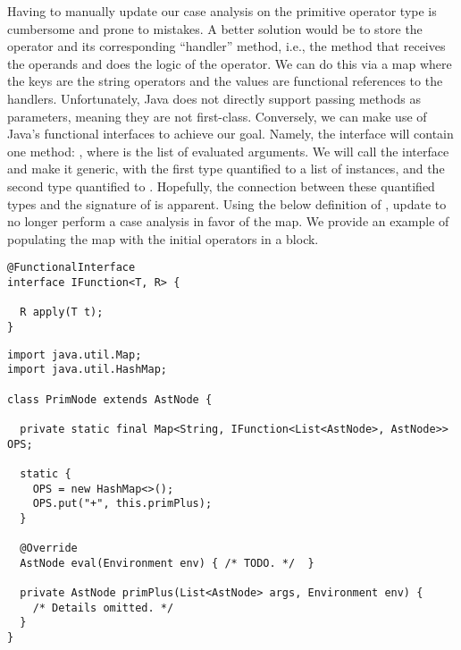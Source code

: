  Having to manually update our case analysis on the primitive operator type is cumbersome and prone to mistakes. A better solution would be to store the operator and its corresponding ``handler'' method, i.e., the method that receives the operands and does the logic of the operator. We can do this via a map where the keys are the string operators and the values are functional references to the handlers. Unfortunately, Java does not directly support passing methods as parameters, meaning they are not first-class. Conversely, we can make use of Java's functional interfaces to achieve our goal. Namely, the interface will contain one method: , where  is the list of evaluated arguments. We will call the interface  and make it generic, with the first type quantified to a list of  instances, and the second type quantified to . Hopefully, the connection between these quantified types and the signature of  is apparent. Using the below definition of , update  to no longer perform a case analysis in favor of the map. We provide an example of populating the map with the initial operators in a  block.

\begin{lstlisting}[language=MyJava]
@FunctionalInterface
interface IFunction<T, R> {
  
  R apply(T t);
}
\end{lstlisting}

\enlargethispage{1\baselineskip}
\begin{lstlisting}[language=MyJava]
import java.util.Map;
import java.util.HashMap;

class PrimNode extends AstNode {
  
  private static final Map<String, IFunction<List<AstNode>, AstNode>> OPS;
  
  static {
    OPS = new HashMap<>();
    OPS.put("+", this.primPlus);
  }

  @Override
  AstNode eval(Environment env) { /* TODO. */  }

  private AstNode primPlus(List<AstNode> args, Environment env) { 
    /* Details omitted. */ 
  }
}
\end{lstlisting}

